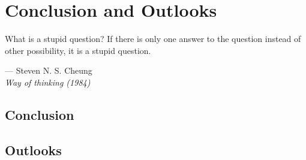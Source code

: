 \chapter{Conclusion and Outlooks}
\label{chap:conclusion}

\setlength{\unitlength}{1pt}
\setlength{\epigraphwidth}{10cm}
\epigraph{What is a stupid question? If there is only one answer to the question instead of other possibility, it is a stupid question.}{--- Steven N. S. Cheung\\ \textit{Way of thinking (1984)}}

\section{Conclusion}
\section{Outlooks}

\chapterend


